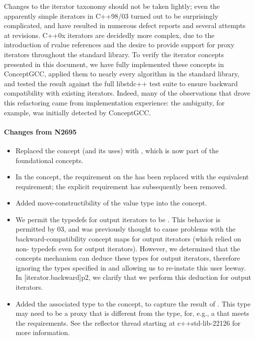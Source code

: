 \documentclass[american,twoside]{book}
\begin{document}
\begin{titlepage}
Changes to the iterator taxonomy should not be taken lightly; even the
apparently simple iterators in C++98/03 turned out to be surprisingly
complicated, and have resulted in numerous defect reports and several
attempts at revisions. C++0x iterators are decidedly more complex, due
to the introduction of rvalue references and the desire to provide
support for proxy iterators throughout the standard library. To verify
the iterator concepts presented in this document, we have fully
implemented these concepts in ConceptGCC, applied them to nearly every
algorithm in the standard library, and tested the result against the
full libstdc++ test suite to ensure backward compatibility with
existing iterators. Indeed, many of the observations that drove this
refactoring came from implementation experience: the 
ambiguity, for example, was initially detected by ConceptGCC. 

\paragraph*{Changes from N2695}
\begin{itemize}
\item Replaced the  concept (and its uses) with
  , which is now part of the foundational concepts.
\item In the  concept, the
   requirement on the  has
  been replaced with the equivalent  requirement;
  the explicit  requirement has
  subsequently been removed.
\item Added move-constructibility of the value type into the
   concept.
\item We permit the  typedefs for output
  iterators to be . This behavior is permitted by
  \Cpp{}03, and was previously thought to cause problems with the
  backward-compatibility concept maps for output iterators (which
  relied on non- typedefs even for output
  iterators). However, we determined that the concepts mechanism can
  deduce these types for output iterators, therefore ignoring the
  types specified in  and allowing us to
  re-instate this user leeway. In [iterator.backward]p2, we clarify
  that we perform this deduction for output iterators.
\item Added the  associated type to the
   concept, to capture the result of
  . This type may need to be a proxy that is
  different from the  type, for, e.g., a
   that meets the 
   requirements. See the reflector thread
  starting at c++std-lib-22126 for more information.
\end{itemize}


\end{titlepage}
\end{document}
